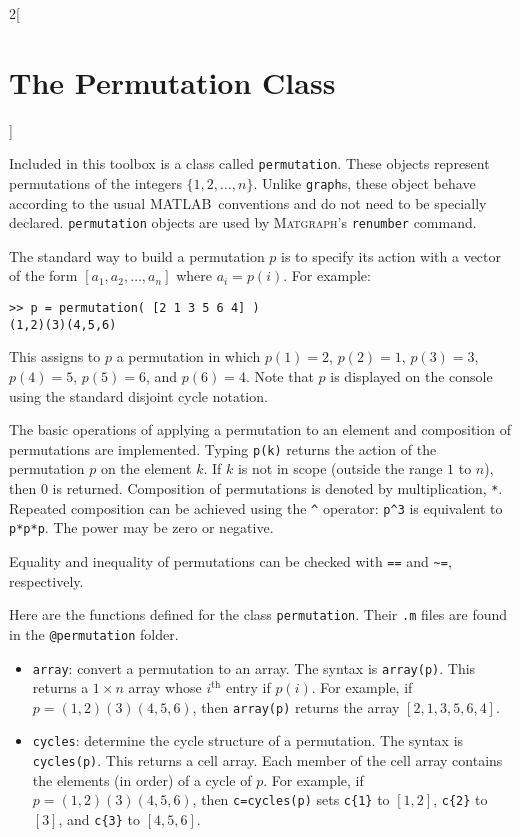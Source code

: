 \documentclass{amsart}
\newcommand\matlab{MATLAB}
\newcommand\matgraph{\textsc{Matgraph}}
\begin{document}
\begin{multicols}{2}[\section{The Permutation Class}]
\label{sect:perms}

Included in this toolbox is a class called \verb|permutation|. These
objects represent permutations of the integers $\{1,2,\ldots,n\}$.
Unlike \verb|graph|s, these object behave according to the usual
\matlab\ conventions and do not need to be specially
declared. \verb|permutation| objects are used by \matgraph's
\verb|renumber| command.

The standard way to build a permutation $p$ is to specify its action with
a vector of the form $[a_1,a_2,\ldots,a_n]$ where $a_i = p(i)$.  For
example:
\begin{verbatim}
>> p = permutation( [2 1 3 5 6 4] )
(1,2)(3)(4,5,6)
\end{verbatim}
This assigns to $p$ a permutation in which $p(1) =2$, $p(2) = 1$,
$p(3)=3$, $p(4)=5$, $p(5)=6$, and $p(6)=4$. Note that $p$ is displayed
on the console using the standard disjoint cycle notation.

The basic operations of applying a permutation to an element and
composition of permutations are implemented. Typing \verb|p(k)|
returns the action of the permutation $p$ on the element $k$. If $k$
is not in scope (outside the range $1$ to $n$), then $0$ is returned.
Composition of permutations is denoted by multiplication, \verb|*|.
Repeated composition can be achieved using the \verb|^| operator:
\verb|p^3| is equivalent to \verb|p*p*p|. The power may be zero or
negative.

Equality and inequality of permutations can be checked with \verb|==|
and \verb|~=|, respectively. 

Here are the functions defined for the class \verb|permutation|. Their
\verb|.m| files are found in the \verb|@permutation| folder.

\begin{itemize}
\item \verb|array|: convert a permutation to an array. The syntax is
  \verb|array(p)|. This returns a $1 \times n$ array whose
  $i^{\text{th}}$ entry if $p(i)$. For example, if
  $p=(1,2)(3)(4,5,6)$, then \verb|array(p)| returns
  the array $[2 ,1 ,3 ,5 ,6 ,4]$. 

\item \verb|cycles|: determine  the cycle structure of a
  permutation. The syntax is \verb|cycles(p)|. This returns a cell
  array. Each member of the cell array contains the elements (in
  order) of a cycle of $p$. For example, if $p=(1,2)(3)(4,5,6)$, then 
  \verb|c=cycles(p)| sets \verb|c{1}| to $[1,2]$, \verb|c{2}| to
  $[3]$, and \verb|c{3}| to $[4,5,6]$. 


\end{itemize}
\end{multicols}
\end{document}
